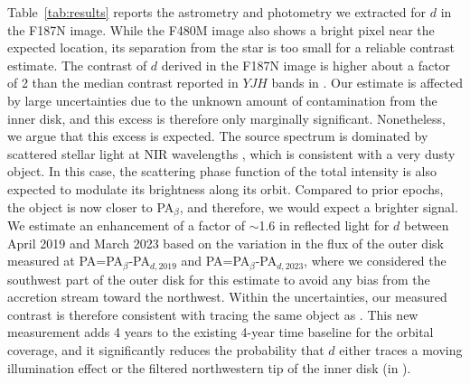 \documentclass[longauth]{aa}
\newcommand{\vc}[1]{#1}
\begin{document}
Table~\ref{tab:results} reports the astrometry and photometry we extracted for $d$ in the F187N image. While the F480M image also shows a bright pixel near the expected location, its separation from the star is too small %
for a reliable contrast estimate. %
The contrast of $d$ derived in the F187N image is higher about a factor of 2 than the median contrast reported in $YJH$ bands in . Our estimate is affected by large uncertainties due to the unknown amount of contamination from the inner disk, and this excess is therefore only marginally significant. Nonetheless, we argue that this excess %
is expected. The source spectrum is dominated by scattered stellar light at NIR wavelengths , which is consistent with a very dusty object. In this case, the scattering phase function of the total intensity is also expected to modulate its brightness along its orbit. Compared to prior epochs, the object is now closer to PA$_{\beta}$, and therefore, we would  %
expect a %
brighter signal. We estimate an enhancement of a factor of $\sim$1.6 in reflected light for $d$ between April 2019 and March 2023 based on the variation in the flux of the outer disk measured at PA=PA$_{\beta}$-PA$_{d,2019}$ and PA=PA$_{\beta}$-PA$_{d,2023}$, where we considered the southwest part of the outer disk for this estimate to avoid any bias from the accretion stream toward the northwest. %
Within the uncertainties, our measured contrast is therefore consistent with tracing the same object as .
This %
new measurement adds 4 years %
to the existing 4-year time baseline for the orbital coverage, and it significantly reduces the probability that $d$ either traces a moving illumination effect or the filtered northwestern tip of the inner disk (in ). %

\end{document}
